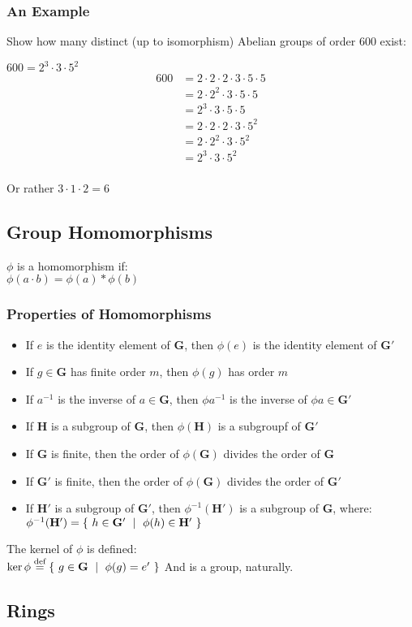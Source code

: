 \documentclass{article}
\begin{document}
  \subsubsection{An Example}

  Show how many distinct (up to isomorphism) Abelian groups of order 600 exist:

  $600 = 2^3 \cdot 3 \cdot 5^2$ \\
  \begin{align*}
    600 & = 2 \cdot 2 \cdot 2\cdot 3 \cdot 5 \cdot 5  \\
        & = 2 \cdot 2^2 \cdot 3 \cdot 5 \cdot 5       \\
        & = 2^3 \cdot 3 \cdot 5 \cdot 5               \\
        & = 2 \cdot 2 \cdot 2\cdot 3 \cdot 5^2        \\
        & = 2 \cdot 2^2 \cdot 3 \cdot 5^2             \\
        & = 2^3 \cdot 3 \cdot 5^2                     \\
  \end{align*}

  Or rather $3 \cdot 1 \cdot 2 = 6$

  \pagebreak
  \subsection{Group Homomorphisms}
  \label{sub-group-homomorphisms}

  $\phi$ is a homomorphism if: \\
  $\phi(a \cdot b) = \phi(a)\ast\phi(b)$

  \subsubsection{Properties of Homomorphisms}

  \begin{itemize}
    \item If $e$ is the identity element of $\mathbf{G}$, then $\phi(e)$ is the identity element of $\mathbf{G}'$
    \item If $g \in \mathbf{G}$ has finite order $m$, then $\phi(g)$ has order $m$
    \item If $a^{-1}$ is the inverse of $a \in \mathbf{G}$, then $\phi{a^{-1}}$ is the inverse of $\phi{a}\in\mathbf{G}'$
    \item If $\mathbf{H}$ is a subgroup of $\mathbf{G}$, then $\phi(\mathbf{H})$ is a subgroupf of $\mathbf{G}'$
    \item If $\mathbf{G}$ is finite, then the order of $\phi(\mathbf{G})$ divides the order of $\mathbf{G}$
    \item If $\mathbf{G}'$ is finite, then the order of $\phi(\mathbf{G})$ divides the order of $\mathbf{G}'$
    \item
      If $\mathbf{H}'$ is a subgroup of $\mathbf{G}'$, then $\phi^{-1}(\mathbf{H}')$ is a subgroup of $\mathbf{G}$, where: \\
      $\phi^{-1}(\mathbf{H}') = \{\ h \in \mathbf{G}'\ \mid\ \phi(h) \in \mathbf{H}'\ \}$
  \end{itemize}

  {\noindent}The kernel of $\phi$ is defined:\\
  {\indent}$\ker \phi \stackrel{\text{def}}{=} \{\ g\in\mathbf{G}\ \mid\ \phi(g) = e'\ \}$
  And is a group, naturally.
   

  \subsection{Rings}
\end{document}
